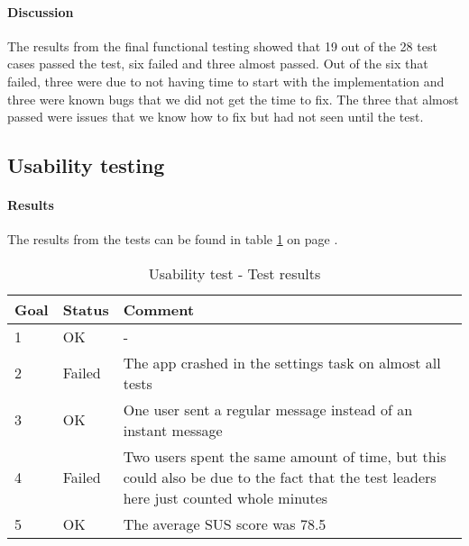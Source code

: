 \paragraph{Discussion}\hfill
\newline
The results from the final functional testing showed that 19 out of the 28 test cases passed the test,  six failed and three almost passed. Out of the six that failed, three were due to not having time to start with the implementation and three were known bugs that we did not get the time to fix. The three that almost passed were issues that we know how to fix but had not seen until the test.

\newpage

\subsection{Usability testing}
\paragraph{Results}\hfill
\newline
The results from the tests can be found in table \ref{tab:usabilitytestresults} on page \pageref{tab:usabilitytestresults}.

\begin{table}[h!]
\begin{center}
\begin{tabular}{l|l|p{8cm}}	\hline
\textbf{Goal}&\textbf{Status}&\textbf{Comment}\\ \hline \hline
1&OK&-\\ \hline
2&Failed&The app crashed in the settings task on almost all tests\\ \hline
3&OK&One user sent a regular message instead of an instant message\\ \hline
4&Failed&Two users spent the same amount of time, but this could also be due to the fact that the test leaders here just counted whole minutes\\ \hline
5&OK&The average SUS score was 78.5\\ \hline 
\end{tabular}
\end{center}
\caption{Usability test - Test results} \label{tab:usabilitytestresults}
\end{table}

